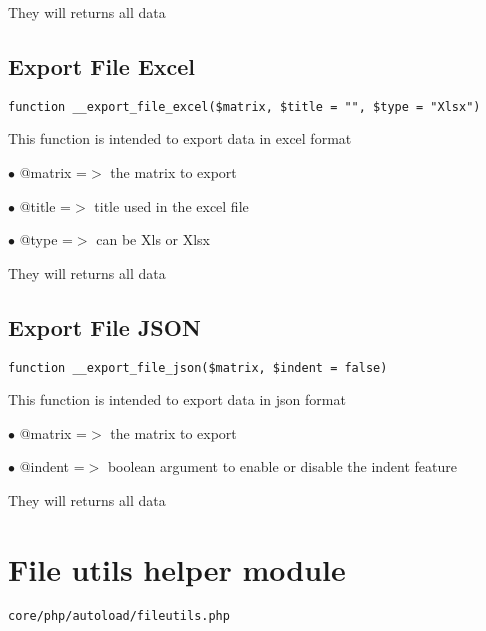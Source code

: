 \documentclass[a4paper]{book}
\begin{document}
They will returns all data

\hypertarget{toc117}{}
\subsection{Export File Excel}

\begin{lstlisting}
function __export_file_excel($matrix, $title = "", $type = "Xlsx")
\end{lstlisting}

This function is intended to export data in excel format

\begin{compactitem}
\item[\color{myblue}$\bullet$] @matrix =$>$ the matrix to export
\item[\color{myblue}$\bullet$] @title  =$>$ title used in the excel file
\item[\color{myblue}$\bullet$] @type   =$>$ can be Xls or Xlsx
\end{compactitem}

They will returns all data

\hypertarget{toc118}{}
\subsection{Export File JSON}

\begin{lstlisting}
function __export_file_json($matrix, $indent = false)
\end{lstlisting}

This function is intended to export data in json format

\begin{compactitem}
\item[\color{myblue}$\bullet$] @matrix =$>$ the matrix to export
\item[\color{myblue}$\bullet$] @indent =$>$ boolean argument to enable or disable the indent feature
\end{compactitem}

They will returns all data

\hypertarget{toc119}{}
\section{File utils helper module}

\begin{lstlisting}
core/php/autoload/fileutils.php
\end{lstlisting}
\end{document}
